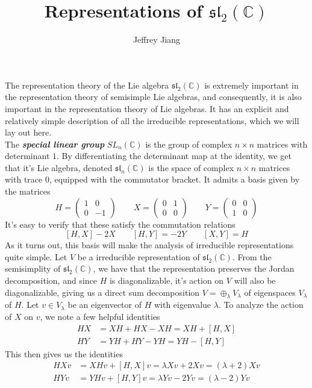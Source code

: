 \documentclass[psamsfonts]{amsart}
\theoremstyle{definition}
\theoremstyle{remark}
\renewcommand{\sl}{\mathfrak{sl}}
\newcommand{\ib}[1]{\textbf{\textit{#1}}}
\newcommand{\C}{\mathbb{C}}
\begin{document}
%
\author{Jeffrey Jiang}
%
\title{Representations of $\mathfrak{sl}_2(\C)$}
%
\setcounter{section}{1}
%
\maketitle
%
The representation theory of the Lie algebra $\sl_2(\C)$ is extremely important
in the representation theory of semisimple Lie algebras, and consequently, it
is also important in the representation theory of Lie algebras. It has an explicit
and relatively simple description of all the irreducible representations, which
we will lay out here.\\

The \ib{special linear group} $SL_n(\C)$ is the group of complex $n \times n$
matrices with determinant $1$. By differentiating the determinant map at the
identity, we get that it's Lie algebra, denoted $\sl_n(\C)$ is the space
of complex $n \times n$ matrices with trace 0, equipped with the commutator
bracket. It admits a basis given by the matrices
\[
H = \begin{pmatrix}
1 & 0 \\
0 & -1
\end{pmatrix} \qquad X = \begin{pmatrix}
0 & 1 \\
0 & 0
\end{pmatrix} \qquad Y = \begin{pmatrix}
0 & 0 \\
1 & 0
\end{pmatrix}
\]
It's easy to verify that these satisfy the commutation relations
\[
[H,X] - 2X \qquad [H,Y] = -2Y \qquad [X,Y] = H
\]
As it turns out, this basis will make the analysis of irreducible representations
quite simple. Let $V$ be a irreducible representation of $\sl_2(\C)$. From the
semisimplity of $\sl_2(\C)$, we have that the representation preserves the Jordan
decomposition, and since $H$ is diagonalizable, it's action on $V$ will also be
diagonalizable, giving us a direct sum decomposition $V = \oplus_\lambda V_\lambda$
of eigenspaces $V_\lambda$ of $H$. Let $v \in V_\lambda$ be an eigenvector of $H$
with eigenvalue $\lambda$. To analyze the action of $X$ on $v$, we note a few
helpful identities
%
\begin{align*}
HX &= XH + HX - XH = XH + [H,X]\\
HY &= YH + HY - YH = YH - [H,Y]
\end{align*}
%
This then gives us the identities
%
\begin{align*}
HXv &= XHv + [H,X]v = \lambda Xv + 2Xv = (\lambda + 2)Xv \\
HYv &= YHv + [H,Y]v = \lambda Yv - 2Yv = (\lambda - 2)Yv
\end{align*}
\end{document}
